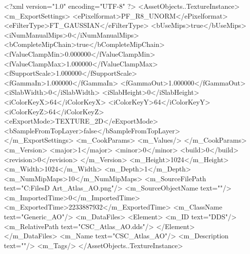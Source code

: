 <?xml version="1.0" encoding="UTF-8" ?>
<AssetObjects..TextureInstance>
	<m_ExportSettings>
		<ePixelformat>PF_R8_UNORM</ePixelformat>
		<eFilterType>FT_GAUSSIAN</eFilterType>
		<bUseMips>true</bUseMips>
		<iNumManualMips>0</iNumManualMips>
		<bCompleteMipChain>true</bCompleteMipChain>
		<fValueClampMin>0.000000</fValueClampMin>
		<fValueClampMax>1.000000</fValueClampMax>
		<fSupportScale>1.000000</fSupportScale>
		<fGammaIn>1.000000</fGammaIn>
		<fGammaOut>1.000000</fGammaOut>
		<iSlabWidth>0</iSlabWidth>
		<iSlabHeight>0</iSlabHeight>
		<iColorKeyX>64</iColorKeyX>
		<iColorKeyY>64</iColorKeyY>
		<iColorKeyZ>64</iColorKeyZ>
		<eExportMode>TEXTURE_2D</eExportMode>
		<bSampleFromTopLayer>false</bSampleFromTopLayer>
	</m_ExportSettings>
	<m_CookParams>
		<m_Values/>
	</m_CookParams>
	<m_Version>
		<major>1</major>
		<minor>0</minor>
		<build>0</build>
		<revision>0</revision>
	</m_Version>
	<m_Height>1024</m_Height>
	<m_Width>1024</m_Width>
	<m_Depth>1</m_Depth>
	<m_NumMipMaps>10</m_NumMipMaps>
	<m_SourceFilePath text="C:\Users\Shadow\Desktop\Working Files\3D Art\Textures\CSC_Atlas_AO.png"/>
	<m_SourceObjectName text=""/>
	<m_ImportedTime>0</m_ImportedTime>
	<m_ExportedTime>2233887932</m_ExportedTime>
	<m_ClassName text="Generic_AO"/>
	<m_DataFiles>
		<Element>
			<m_ID text="DDS"/>
			<m_RelativePath text="CSC_Atlas_AO.dds"/>
		</Element>
	</m_DataFiles>
	<m_Name text="CSC_Atlas_AO"/>
	<m_Description text=""/>
	<m_Tags/>
</AssetObjects..TextureInstance>

